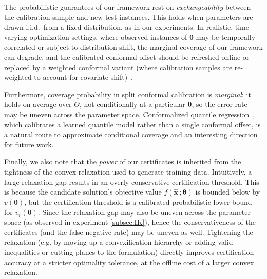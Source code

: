\documentclass[10pt]{article} %
\theoremstyle{plain}
\theoremstyle{definition}
\theoremstyle{remark}
\begin{document}
The probabilistic guarantees of our framework rest on \emph{exchangeability} between the
calibration sample and new test instances. This holds when parameters are drawn
i.i.d.\ from a fixed distribution, as in our experiments.
In realistic, time-varying optimization settings, where observed instances of $\bm{\theta}$ may be 
temporally correlated or subject to distribution shift, the marginal coverage of our framework can degrade, 
and the calibrated conformal offset should be refreshed online or replaced by a weighted conformal variant
(where calibration samples are re-weighted to account for covariate shift)~\citep{tibshirani2019conformal}.

Furthermore, coverage probability in split conformal calibration
is \emph{marginal}: it holds on average over $\Theta$, not conditionally at a
particular $\bm{\theta}$, so the error rate may be uneven across the parameter
space. Conformalized quantile regression~\citep{romano2019conformalized}, which
calibrates a learned quantile model rather than a single conformal offset, is a
natural route to approximate conditional coverage and an interesting direction for
future work.

Finally, we also note that the \emph{power} of our certificates is inherited from the
tightness of the convex relaxation used to generate training data.
Intuitively, a large relaxation gap results in an overly conservative certification
threshold. This is because the candidate solution's
objective value $f(\hat{\mathbf{x}}\, ; \bm{\theta})$ is bounded below by $v(\bm{\theta})$,
but the certification threshold is a calibrated probabilistic lower bound for $v_r(\bm{\theta})$.
Since the relaxation gap may also be uneven across the parameter space (as observed in experiment \ref{subsec:IK}),
hence the conservativeness of the certificates (and the false negative rate) may be uneven as well.
Tightening the relaxation (e.g. by moving up a convexification
hierarchy or adding valid inequalities or cutting planes to the formulation) 
directly improves certification accuracy at a stricter optimality tolerance, at the
offline cost of a larger convex relaxation.
\end{document}
